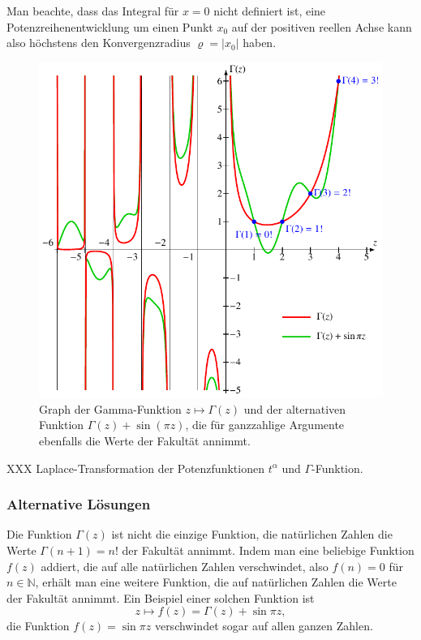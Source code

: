 Man beachte, dass das Integral für $x=0$ nicht definiert ist, eine
Potenzreihenentwicklung um einen Punkt $x_0$ auf der positiven reellen
Achse kann also höchstens den Konvergenzradius $\varrho=|x_0|$ haben.

\begin{figure}
\centering
\includegraphics{chapters/040-rekursion/images/gammaplot.pdf}
\caption{Graph der Gamma-Funktion $z\mapsto\Gamma(z)$ und der alternativen
Funktion $\Gamma(z)+\sin(\pi z)$, die für ganzzahlige Argumente ebenfalls
die Werte der Fakultät annimmt.
\label{buch:rekursion:fig:gamma}}
\end{figure}

XXX Laplace-Transformation der Potenzfunktionen $t^\alpha$ und
$\Gamma$-Funktion.

\subsubsection{Alternative Lösungen}
Die Funktion $\Gamma(z)$ ist nicht die einzige Funktion, die natürlichen
Zahlen die Werte $\Gamma(n+1) = n!$ der Fakultät annimmt.
Indem man eine beliebige Funktion $f(z)$ addiert, die auf alle
natürlichen Zahlen verschwindet, also $f(n)=0$ für $n\in\mathbb{N}$,
erhält man eine weitere Funktion, die auf natürlichen Zahlen
die Werte der Fakultät annimmt.
Ein Beispiel einer solchen Funktion ist
\begin{equation}
z\mapsto f(z)=\Gamma(z) + \sin \pi z,
\label{buch:rekursion:eqn:gammaalternative}
\end{equation}
die Funktion $f(z)=\sin\pi z$ verschwindet sogar auf allen ganzen
Zahlen.

